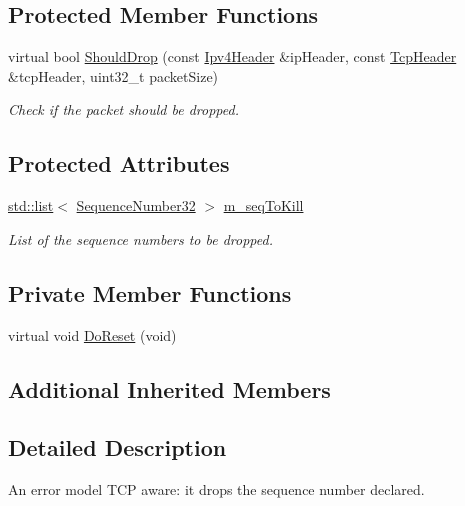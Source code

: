 \subsection*{Protected Member Functions}
\begin{DoxyCompactItemize}
\item 
virtual bool \hyperlink{classns3_1_1TcpSeqErrorModel_a3958ef76d5830e46a4f5f890eb1397a3}{Should\+Drop} (const \hyperlink{classns3_1_1Ipv4Header}{Ipv4\+Header} \&ip\+Header, const \hyperlink{classns3_1_1TcpHeader}{Tcp\+Header} \&tcp\+Header, uint32\+\_\+t packet\+Size)
\begin{DoxyCompactList}\small\item\em Check if the packet should be dropped. \end{DoxyCompactList}\end{DoxyCompactItemize}
\subsection*{Protected Attributes}
\begin{DoxyCompactItemize}
\item 
\hyperlink{openflow-interface_8h_afd9bcfa176617760671b67580f536fa7}{std\+::list}$<$ \hyperlink{group__network_gacb2070e4e98d2d5135c9bede58f07a03}{Sequence\+Number32} $>$ \hyperlink{classns3_1_1TcpSeqErrorModel_a6b754afe083cbc3e8f5c1d9e993cd052}{m\+\_\+seq\+To\+Kill}
\begin{DoxyCompactList}\small\item\em List of the sequence numbers to be dropped. \end{DoxyCompactList}\end{DoxyCompactItemize}
\subsection*{Private Member Functions}
\begin{DoxyCompactItemize}
\item 
virtual void \hyperlink{classns3_1_1TcpSeqErrorModel_a640d4ac0900538db580e632e164a2d5b}{Do\+Reset} (void)
\end{DoxyCompactItemize}
\subsection*{Additional Inherited Members}


\subsection{Detailed Description}
An error model T\+CP aware\+: it drops the sequence number declared. 

